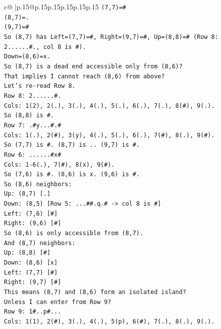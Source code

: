 \documentclass{article}
\begin{document}
{\begin{supertabular}{c@{$\;$}|p{.15\linewidth}@{}p{.15\linewidth}p{.15\linewidth}p{.15\linewidth}p{.15\linewidth}p{.15\linewidth}}
{{{\texttt{(7,7)=\#} \\
\texttt{(8,7)=.} \\
\texttt{(9,7)=\#} \\
\texttt{So (8,7) has Left=(7,7)=\#, Right=(9,7)=\#, Up=(8,8)=\# (Row 8: 2......\#., col 8 is \#).} \\
\texttt{Down=(8,6)=x.} \\
\texttt{So (8,7) is a dead end accessible only from (8,6)?} \\
\texttt{That implies I cannot reach (8,6) from above?} \\
\texttt{Let's re{-}read Row 8.} \\
\texttt{Row 8: 2......\#.} \\
\texttt{Cols: 1(2), 2(.), 3(.), 4(.), 5(.), 6(.), 7(.), 8(\#), 9(.).} \\
\texttt{So (8,8) is \#.} \\
\texttt{Row 7: .\#y...\#.\#} \\
\texttt{Cols: 1(.), 2(\#), 3(y), 4(.), 5(.), 6(.), 7(\#), 8(.), 9(\#).} \\
\texttt{So (7,7) is \#. (8,7) is .. (9,7) is \#.} \\
\texttt{Row 6: ......\#x\#} \\
\texttt{Cols: 1{-}6(.), 7(\#), 8(x), 9(\#).} \\
\texttt{So (7,6) is \#. (8,6) is x. (9,6) is \#.} \\
\texttt{So (8,6) neighbors:} \\
\texttt{Up: (8,7) {[}.{]}} \\
\texttt{Down: (8,5) {[}Row 5: ...\#\#.q.\# {-}> col 8 is \#{]}} \\
\texttt{Left: (7,6) {[}\#{]}} \\
\texttt{Right: (9,6) {[}\#{]}} \\
\texttt{So (8,6) is only accessible from (8,7).} \\
\texttt{And (8,7) neighbors:} \\
\texttt{Up: (8,8) {[}\#{]}} \\
\texttt{Down: (8,6) {[}x{]}} \\
\texttt{Left: (7,7) {[}\#{]}} \\
\texttt{Right: (9,7) {[}\#{]}} \\
\texttt{This means (8,7) and (8,6) form an isolated island?} \\
\texttt{Unless I can enter from Row 9?} \\
\texttt{Row 9: 1\#..p\#...} \\
\texttt{Cols: 1(1), 2(\#), 3(.), 4(.), 5(p), 6(\#), 7(.), 8(.), 9(.).} \\
}}}
\end{supertabular}}
\end{document}
